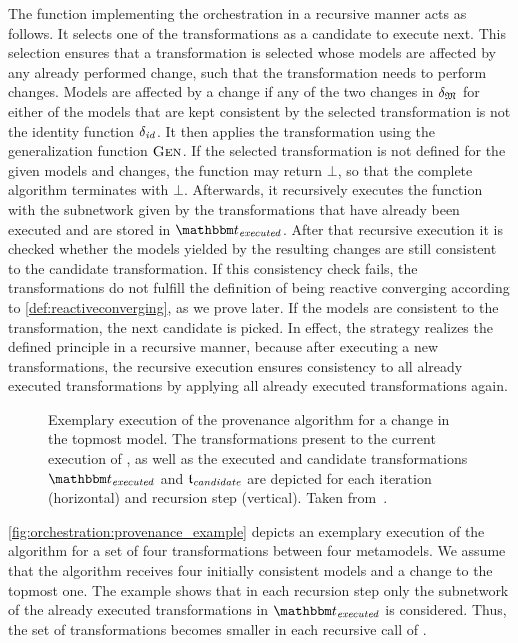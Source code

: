 The function  implementing the orchestration in a recursive manner acts as follows.
It selects one of the transformations as a candidate to execute next.
This selection ensures that a transformation is selected whose models are affected by any already performed change, such that the transformation needs to perform changes.
Models are affected by a change if any of the two changes in $\change{\metamodeltuple{M}}$ for either of the models that are kept consistent by the selected transformation is not the identity function $\delta_{\mathit{id}}$.
It then applies the transformation using the generalization function $\textsc{Gen}_{}$.
If the selected transformation is not defined for the given models and changes, the function may return $\bot$, so that the complete algorithm terminates with $\bot$.
Afterwards, it recursively executes the function  with the subnetwork given by the transformations that have already been executed and are stored in $\provalgexecuted$.
After that recursive execution it is checked whether the models yielded by the resulting changes are still consistent to the candidate transformation.
If this consistency check fails, the transformations do not fulfill the definition of being reactive converging according to \autoref{def:reactiveconverging}, as we prove later.
If the models are consistent to the transformation, the next candidate is picked.
In effect, the strategy realizes the defined principle in a recursive manner, because after executing a new transformations, the recursive execution ensures consistency to all already executed transformations by applying all already executed transformations again.

\begin{figure}
    \centering
    
    \caption[Exemplary execution of the provenance algorithm]{%
    Exemplary execution of the provenance algorithm for a change in the topmost model. 
    The transformations present to the current execution of , as well as the executed and candidate transformations $\provalgexecuted$ and $\provalgcandidate$ are depicted for each iteration (horizontal) and recursion step (vertical). Taken from~.
}
    \label{fig:orchestration:provenance_example}
\end{figure}

\autoref{fig:orchestration:provenance_example} depicts an exemplary execution of the  algorithm for a set of four transformations between four metamodels.
We assume that the algorithm receives four initially consistent models and a change to the topmost one.
The example shows that in each recursion step only the subnetwork of the already executed transformations in $\provalgexecuted$ is considered.
Thus, the set of transformations becomes smaller in each recursive call of .


